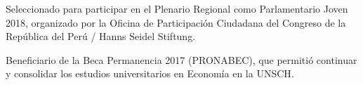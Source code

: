 \begin{scholarship}
	{Seleccionado para participar en el Plenario Regional como Parlamentario Joven
		2018, organizado por la Oficina de Participación Ciudadana del Congreso de
		la República del Perú / Hanns Seidel Stiftung.}
	
	{Beneficiario de la Beca Permanencia 2017 (PRONABEC), que permitió continuar
		y consolidar los estudios universitarios en Economía en la UNSCH.}
	
\end{scholarship}

